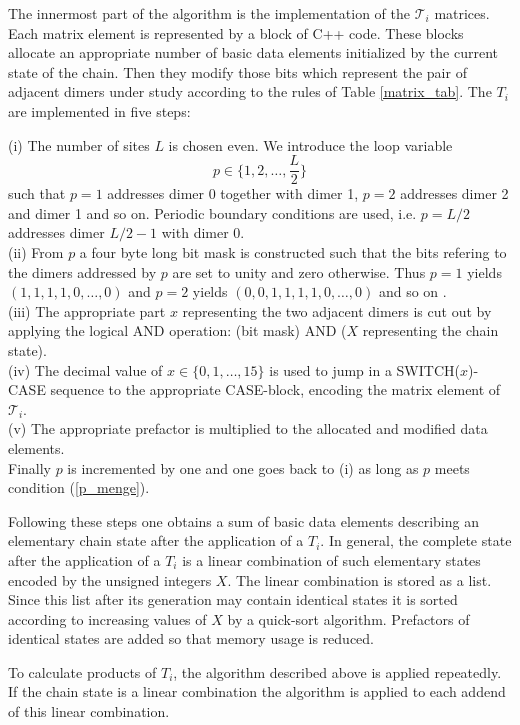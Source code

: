 The innermost part of the algorithm is the implementation of the 
${\mathcal{T}}_i$ matrices. Each matrix element is represented by a block of 
C++ code. These blocks allocate an appropriate number of basic data elements
 initialized by the current state of the chain. Then they
 modify those bits which 
represent the pair of adjacent dimers under study according to the rules of 
Table \ref{matrix_tab}. The $T_i$ are implemented in five steps:

\noindent
(i) The number of sites $L$ is chosen  even. We introduce the loop variable
\begin{equation}
  \label{p_menge}
  p \in \{1,2,\ldots,\frac{L}{2}\}
\end{equation}
such that $p=1$ addresses dimer 0 together with dimer 1, $p=2$ addresses dimer
 2 and dimer 1 and so on. Periodic boundary conditions  are used, i.e.
$p=L/2$ addresses dimer $L/2-1$ with dimer 0.\\
(ii) From $p$ a four byte long bit mask is constructed such that the bits
refering to the dimers addressed by $p$ are set to unity and zero otherwise.
 Thus $p=1$ yields $(1,1,1,1,0,\ldots,0)$ and $p=2$
 yields $(0,0,1,1,1,1,0,\ldots,0)$ and so on .\\
(iii) The appropriate part $x$ representing the two adjacent dimers is cut out
 by applying the logical AND operation: (bit mask) AND ($X$ representing the 
chain state).\\
(iv) The decimal value of $x \in \{0,1,\ldots,15\}$ is used to jump
in a SWITCH($x$)-CASE sequence to the appropriate CASE-block, 
encoding the matrix element of  ${\mathcal{T}}_i$.\\
(v) The appropriate prefactor is multiplied
 to the allocated and modified data elements.\\
Finally  $p$ is incremented by one and one goes back
 to (i) as long as $p$ meets  condition (\ref{p_menge}). 

Following these steps one obtains a sum of basic data elements
describing an elementary  chain state after the application of a $T_i$.
 In general, the complete state after the application of a $T_i$ is a
 linear combination of such elementary states encoded by the unsigned 
integers $X$. The linear combination is stored as a list.
 Since this list after its generation 
may contain identical states it is sorted according to
increasing values of $X$ by a quick-sort algorithm. Prefactors of identical 
states are added so that memory usage is reduced.

To calculate products of $T_i$, the algorithm described above
is applied repeatedly. If the chain state is a linear combination the
algorithm is applied to each addend of this linear combination.

